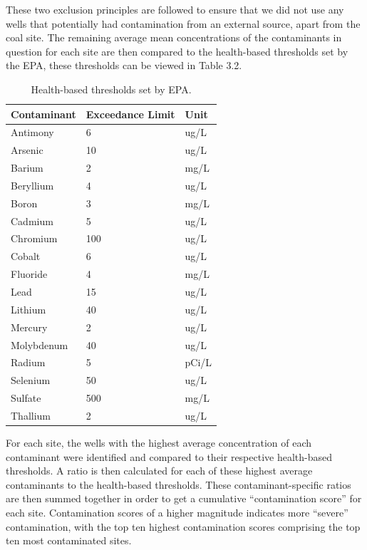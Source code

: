 \documentclass[12pt, twoside]{amherstthesis}
\begin{document}
These two exclusion principles are followed to ensure that we did not use any wells that potentially had contamination from an external source, apart from the coal site. The remaining average mean concentrations of the contaminants in question for each site are then compared to the health-based thresholds set by the EPA, these thresholds can be viewed in Table 3.2.
\begin{table}

\caption{\label{tab:unnamed-chunk-7}Health-based thresholds set by EPA.}
\centering
\begin{tabular}[t]{lll}
\toprule
Contaminant & Exceedance Limit & Unit\\
\midrule
Antimony & 6 & ug/L\\
\addlinespace
Arsenic & 10 & ug/L\\
\addlinespace
Barium & 2 & mg/L\\
\addlinespace
Beryllium & 4 & ug/L\\
\addlinespace
Boron & 3 & mg/L\\
\addlinespace
Cadmium & 5 & ug/L\\
\addlinespace
Chromium & 100 & ug/L\\
\addlinespace
Cobalt & 6 & ug/L\\
\addlinespace
Fluoride & 4 & mg/L\\
\addlinespace
Lead & 15 & ug/L\\
\addlinespace
Lithium & 40 & ug/L\\
\addlinespace
Mercury & 2 & ug/L\\
\addlinespace
Molybdenum & 40 & ug/L\\
\addlinespace
Radium & 5 & pCi/L\\
\addlinespace
Selenium & 50 & ug/L\\
\addlinespace
Sulfate & 500 & mg/L\\
\addlinespace
Thallium & 2 & ug/L\\
\bottomrule
\end{tabular}
\end{table}
For each site, the wells with the highest average concentration of each contaminant were identified and compared to their respective health-based thresholds. A ratio is then calculated for each of these highest average contaminants to the health-based thresholds. These contaminant-specific ratios are then summed together in order to get a cumulative ``contamination score'' for each site. Contamination scores of a higher magnitude indicates more ``severe'' contamination, with the top ten highest contamination scores comprising the top ten most contaminated sites.
\end{document}
